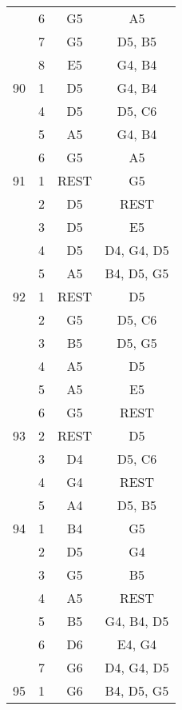 \documentclass{article}
\begin{document}
\begin{longtable}{|c|c|c|c|}
  & 6 & G5 & A5 \\ 
  & 7 & G5 & D5, B5 \\ 
  & 8 & E5 & G4, B4 \\ 
\hline
90 & 1 & D5 & G4, B4 \\ 
  & 4 & D5 & D5, C6 \\ 
  & 5 & A5 & G4, B4 \\ 
  & 6 & G5 & A5 \\ 
\hline
91 & 1 & REST & G5 \\ 
  & 2 & D5 & REST \\ 
  & 3 & D5 & E5 \\ 
  & 4 & D5 & D4, G4, D5 \\ 
  & 5 & A5 & B4, D5, G5 \\ 
\hline
92 & 1 & REST & D5 \\ 
  & 2 & G5 & D5, C6 \\ 
  & 3 & B5 & D5, G5 \\ 
  & 4 & A5 & D5 \\ 
  & 5 & A5 & E5 \\ 
  & 6 & G5 & REST \\ 
\hline
93 & 2 & REST & D5 \\ 
  & 3 & D4 & D5, C6 \\ 
  & 4 & G4 & REST \\ 
  & 5 & A4 & D5, B5 \\ 
\hline
94 & 1 & B4 & G5 \\ 
  & 2 & D5 & G4 \\ 
  & 3 & G5 & B5 \\ 
  & 4 & A5 & REST \\ 
  & 5 & B5 & G4, B4, D5 \\ 
  & 6 & D6 & E4, G4 \\ 
  & 7 & G6 & D4, G4, D5 \\ 
\hline
95 & 1 & G6 & B4, D5, G5 \\ 
\hline
\end{longtable}
\end{document}
